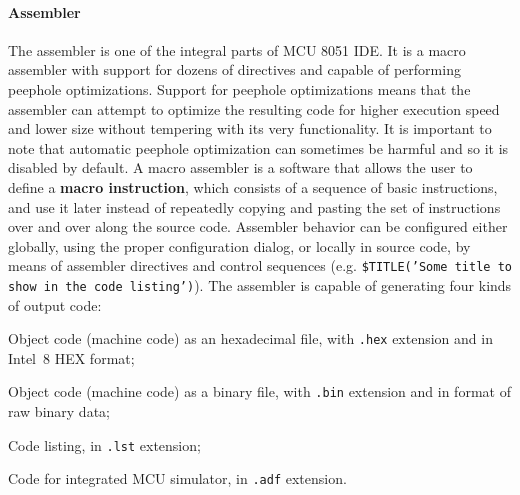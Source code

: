 \documentclass[a4paper,twoside,12pt]{book}
\newcommand{\fileextension}[1]{\texttt{#1}}
\begin{document}
		\paragraph{Assembler} The assembler is one of the integral parts of MCU 8051 IDE. It is a macro assembler with support for dozens of directives and capable of performing peephole optimizations. Support for peephole optimizations means that the assembler can attempt to optimize the resulting code for higher execution speed and lower size without tempering with its very functionality. It is important to note that automatic peephole optimization can sometimes be harmful and so it is disabled by default. A macro assembler is a software that allows  the user to define a \textbf{macro instruction}, which consists of a sequence of basic instructions, and use it later instead of repeatedly copying and pasting the set of instructions over and over along the source code. Assembler behavior can be configured either globally, using the proper configuration dialog, or locally in source code, by means of assembler directives and control sequences (e.g. \texttt{\$TITLE('Some title to show in the code listing')}). The assembler is capable of generating four kinds of output code:
		\begin{dinglist}{43}
			\setlength{\itemsep}{-3pt}
			\item Object code (machine code) as an hexadecimal file, with \fileextension{.hex} extension and in Intel\textregistered\ 8 HEX format;
			\item Object code (machine code) as a binary file, with \fileextension{.bin} extension and in format of raw binary data;
			\item Code listing, in \fileextension{.lst} extension;
			\item Code for integrated MCU simulator, in \fileextension{.adf} extension.
		\end{dinglist}
\end{document}
